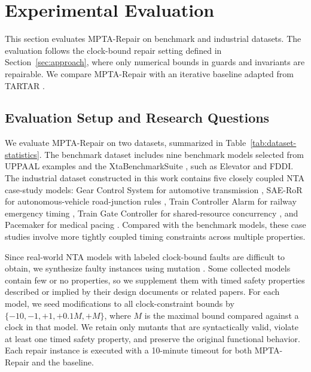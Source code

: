 \section{Experimental Evaluation}
\label{sec:evaluation}

This section evaluates MPTA-Repair on benchmark and industrial
datasets. The evaluation follows the clock-bound repair setting
defined in Section~\ref{sec:approach}, where only numerical bounds in
guards and invariants are repairable. We compare MPTA-Repair with an
iterative baseline adapted from TARTAR
\cite{kolbl2019clock}.

\subsection{Evaluation Setup and Research Questions}

We evaluate MPTA-Repair on two datasets, summarized in
Table~\ref{tab:dataset-statistics}. The benchmark dataset includes nine
benchmark models selected from UPPAAL examples
\cite{behrmann2004tutorial} and the XtaBenchmarkSuite
\cite{farkas2018benchmarks}, such as Elevator and FDDI. The industrial
dataset constructed in this work contains five closely coupled NTA
case-study models: Gear Control System for automotive transmission
\cite{lindahl1998gear}, SAE-RoR for autonomous-vehicle road-junction rules
\cite{alves2021double}, Train Controller Alarm for railway emergency
timing \cite{gonzalez2024uppaal}, Train Gate Controller for
shared-resource concurrency \cite{alur1994theory}, and Pacemaker for
medical pacing \cite{jiang2010heart}. Compared with the benchmark
models, these case studies involve more tightly coupled timing
constraints across multiple properties.



Since real-world NTA models with labeled clock-bound faults are
difficult to obtain, we synthesize faulty instances using mutation
\cite{jia2011mutation}. Some collected models contain few or no
properties, so we supplement them with timed safety properties described
or implied by their design documents or related papers. For each model,
we seed modifications to all clock-constraint bounds by
$\{-10,-1,+1,+0.1M,+M\}$, where $M$ is the maximal bound compared
against a clock in that model. We retain only mutants that are
syntactically valid, violate at least one timed safety property, and
preserve the original functional behavior. Each repair instance is
executed with a 10-minute timeout for both MPTA-Repair and the baseline.

